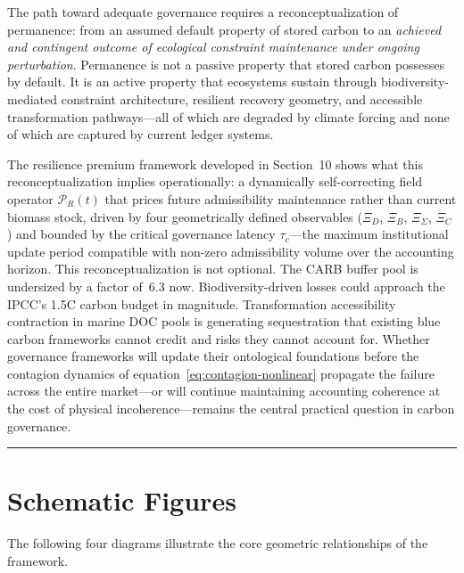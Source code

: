 \documentclass[12pt]{article}
\begin{document}
The path toward adequate governance requires a reconceptualization of permanence: from an
assumed default property of stored carbon to an \emph{achieved and contingent outcome of
ecological constraint maintenance under ongoing perturbation}. Permanence is not a
passive property that stored carbon possesses by default. It is an active property that
ecosystems sustain through biodiversity-mediated constraint architecture, resilient
recovery geometry, and accessible transformation pathways---all of which are degraded by
climate forcing and none of which are captured by current ledger systems.

The resilience premium
framework developed in Section~10 shows what this reconceptualization implies
operationally: a dynamically self-correcting field operator $\mathcal{P}_R(t)$ that prices
future admissibility maintenance rather than current biomass stock, driven by four
geometrically defined observables ($\Xi_D$, $\Xi_B$, $\Xi_\Sigma$, $\Xi_C$) and
bounded by the critical governance latency $\tau_c$---the maximum institutional update
period compatible with non-zero admissibility volume over the accounting horizon. This
reconceptualization is not optional. The CARB buffer pool is undersized by a factor
of~6.3 now. Biodiversity-driven losses could approach the IPCC's 1.5\textdegree C carbon
budget in magnitude. Transformation accessibility contraction in marine DOC pools is
generating sequestration that existing blue carbon frameworks cannot credit and risks they
cannot account for. Whether governance frameworks will update their ontological foundations
before the contagion dynamics of equation~\eqref{eq:contagion-nonlinear} propagate the
failure across the entire market---or will continue maintaining accounting coherence at
the cost of physical incoherence---remains the central practical question in carbon
governance.

\bigskip
\noindent\rule{\linewidth}{0.4pt}
\bigskip

\appendix

\section{Schematic Figures}
\label{app:figures}

The following four diagrams illustrate the core geometric relationships of the framework.
\end{document}
